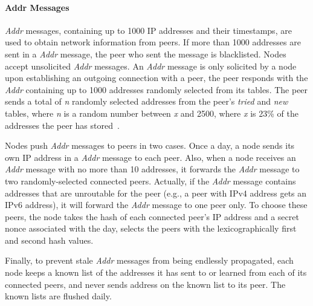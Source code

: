 \paragraph*{Addr Messages}
\textsl{Addr} messages, containing up to 1000 IP addresses and their timestamps, are used to obtain network information from peers. If more than 1000 addresses are sent in a \textsl{Addr} message, the peer who sent the message is blacklisted. Nodes accept unsolicited \textsl{Addr} messages. An \textsl{Addr} message is only solicited by a node upon establishing an outgoing connection with a peer, the peer responds with the \textsl{Addr} containing up to 1000 addresses randomly selected from its tables. The peer sends a total of \textsl{n} randomly selected addresses from the peer’s \emph{tried} and \emph{new} tables, where \textsl{n} is a random number between \textsl{x} and 2500, where \textsl{x} is 23\% of the addresses the peer has stored~\cite{heilman2015eclipse}.

Nodes push \textsl{Addr} messages to peers in two cases. Once a day, a node sends its own IP address in a \textsl{Addr} message to each peer. Also, when a node receives an \textsl{Addr} message with no more than 10 addresses, it forwards the \textsl{Addr} message to two randomly-selected connected peers. Actually, if the \textsl{Addr} message contains addresses that are unroutable for the peer (e.g., a peer with IPv4 address gets an IPv6 address), it will forward the \textsl{Addr} message to one peer only. To choose these peers, the node takes the hash of each connected peer’s IP address and a secret nonce associated with the day, selects the peers with the lexicographically first and second hash values.

Finally, to prevent stale \textsl{Addr} messages from being endlessly propagated, each node keeps a known list of the addresses it has sent to or learned from each of its connected peers, and never sends address on the known list to its peer. The known lists are flushed daily.


